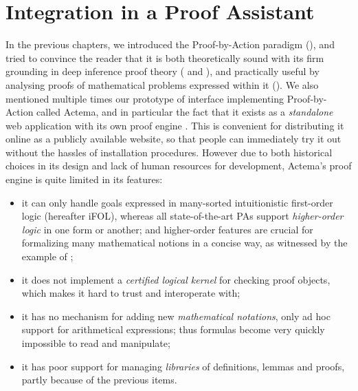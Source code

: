 \setchapterpreamble[u]{\margintoc}
\chapter{Integration in a Proof Assistant}

In the previous chapters, we introduced the Proof-by-Action paradigm
(), and tried to convince the reader that it is both theoretically
sound with its firm grounding in deep inference proof theory ( and
), and practically useful by analysing proofs of
mathematical problems expressed within it (). We also mentioned
multiple times our prototype of interface implementing Proof-by-Action called
Actema, and in particular the fact that it exists as a \emph{standalone} web
application with its own proof engine . This is
convenient for distributing it online as a publicly available website, so that
people can immediately try it out without the hassles of installation
procedures. However due to both historical choices in its design and lack of
human resources for development, Actema's proof engine is quite limited in its
features:
\begin{itemize}
  \item it can only handle goals expressed in many-sorted intuitionistic
    first-order logic (hereafter iFOL), whereas all state-of-the-art PAs support
    \emph{higher-order logic} in one form or another; and higher-order features
    are crucial for formalizing many mathematical notions in a concise way, as
    witnessed by the example of ;
  \item it does not implement a \emph{certified logical kernel} for checking proof
    objects, which makes it hard to trust and interoperate with;
  \item it has no mechanism for adding new \emph{mathematical notations}, only
    ad hoc support for arithmetical expressions; thus formulas become very
    quickly impossible to read and manipulate;
  \item it has poor support for managing \emph{libraries} of definitions, lemmas
    and proofs, partly because of the previous items.
\end{itemize}

